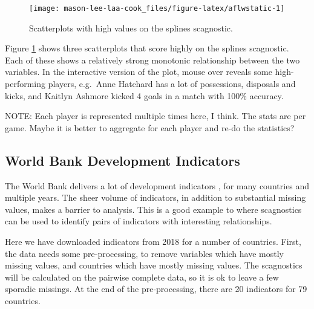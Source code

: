 \begin{Schunk}
\begin{figure}
\texttt{[image: mason-lee-laa-cook\_files/figure-latex/aflwstatic-1]} \caption[Scatterplots with high values on the splines scagnostic]{Scatterplots with high values on the splines scagnostic.}\label{fig:aflwstatic}
\end{figure}
\end{Schunk}

Figure \ref{fig:aflwstatic} shows three scatterplots that score highly
on the splines scagnostic. Each of these shows a relatively strong
monotonic relationship between the two variables. In the interactive
version of the plot, mouse over reveals some high-performing players,
e.g.~Anne Hatchard has a lot of possessions, disposals and kicks, and
Kaitlyn Ashmore kicked 4 goals in a match with 100\% accuracy.

NOTE: Each player is represented multiple times here, I think. The stats
are per game. Maybe it is better to aggregate for each player and re-do
the statistics?

\hypertarget{world-bank-development-indicators}{%
\subsection{World Bank Development
Indicators}\label{world-bank-development-indicators}}

The World Bank delivers a lot of development indicators \citep{WBI}, for
many countries and multiple years. The sheer volume of indicators, in
addition to substantial missing values, makes a barrier to analysis.
This is a good example to where scagnostics can be used to identify
pairs of indicators with interesting relationships.

Here we have downloaded indicators from 2018 for a number of countries.
First, the data needs some pre-processing, to remove variables which
have mostly missing values, and countries which have mostly missing
values. The scagnostics will be calculated on the pairwise complete
data, so it is ok to leave a few sporadic missings. At the end of the
pre-processing, there are 20 indicators for 79 countries.

